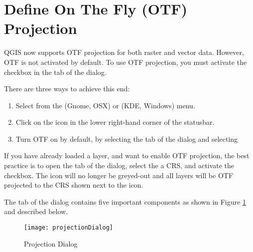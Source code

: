 \section{Define On The Fly (OTF) Projection}\label{label_projstart}

QGIS now supports OTF projection for both raster and vector
data. However, OTF is not activated by default. To use OTF projection,
you must activate the  checkbox
in the  tab of the  dialog.

There are three ways to achieve this end:
\begin{enumerate}
\item Select  from the
 (Gnome, OSX) or  (KDE, Windows) menu.
\item Click on the  icon in the
lower right-hand corner of the statusbar.
\item Turn OTF on by default, by selecting the  tab of the 
   dialog and selecting 
\end{enumerate}

If you have already loaded a layer, and want to enable OTF projection, the
best practice is to open the  tab of the
 dialog, select the a CRS, and activate the
 checkbox. The
 icon will no longer be greyed-out
and all layers will be OTF projected to the CRS shown next to the icon.

The  tab of the 
dialog contains five important components as shown in Figure
\ref{fig:projections} and described below.

\begin{figure}[ht]
   \centering
   \texttt{[image: projectionDialog]}
   \caption{Projection Dialog \wincaption}\label{fig:projections}
\end{figure}

